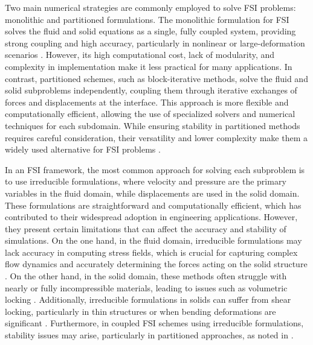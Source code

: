 \documentclass[11pt,english]{article}
\begin{document}
Two main numerical strategies are commonly employed to solve FSI problems: monolithic and partitioned formulations. The monolithic formulation for FSI solves the fluid and solid equations as a single, fully coupled system, providing strong coupling and high accuracy, particularly in nonlinear or large-deformation scenarios \cite{FSIMonolithic}. However, its high computational cost, lack of modularity, and complexity in implementation make it less practical for many applications. In contrast, partitioned schemes, such as block-iterative methods, solve the fluid and solid subproblems independently, coupling them through iterative exchanges of forces and displacements at the interface. This approach is more flexible and computationally efficient, allowing the use of specialized solvers and numerical techniques for each subdomain. While ensuring stability in partitioned methods requires careful consideration, their versatility and lower complexity make them a widely used alternative for FSI problems \cite{FSIPartitioned}. 

In an FSI framework, the most common approach for solving each subproblem is to use irreducible formulations, where velocity and pressure are the primary variables in the fluid domain, while displacements are used in the solid domain. These formulations are straightforward and computationally efficient, which has contributed to their widespread adoption in engineering applications. However, they present certain limitations that can affect the accuracy and stability of simulations.
On the one hand, in the fluid domain, irreducible formulations may lack accuracy in computing stress fields, which is crucial for capturing complex flow dynamics and accurately determining the forces acting on the solid structure \cite{MorenoCastanarFSIVisco}. On the other hand, in the solid domain, these methods often struggle with nearly or fully incompressible materials, leading to issues such as volumetric locking \cite{Simo}. Additionally, irreducible formulations in solids can suffer from shear locking, particularly in thin structures or when bending deformations are significant \cite{Cook2002,aguirreFSI}. Furthermore, in coupled FSI schemes using irreducible formulations, stability issues may arise, particularly in partitioned approaches, as noted in \cite{Fernandez2007}.
\end{document}
